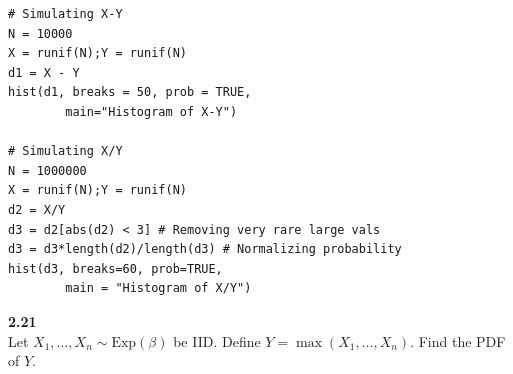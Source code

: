 \begin{lstlisting}[style=RSyntax, title=R]
# Simulating X-Y
N = 10000
X = runif(N);Y = runif(N)
d1 = X - Y
hist(d1, breaks = 50, prob = TRUE,
        main="Histogram of X-Y")

# Simulating X/Y
N = 1000000
X = runif(N);Y = runif(N)
d2 = X/Y
d3 = d2[abs(d2) < 3] # Removing very rare large vals
d3 = d3*length(d2)/length(d3) # Normalizing probability
hist(d3, breaks=60, prob=TRUE,
        main = "Histogram of X/Y")
\end{lstlisting}

\bigskip\noindent
\textbf{2.21}\\  %
Let $X_1,\ldots,X_n\sim\text{Exp}(\beta)$ be IID. Define $Y = \max(X_1,\ldots,X_n)$.
Find the PDF of $Y$.










